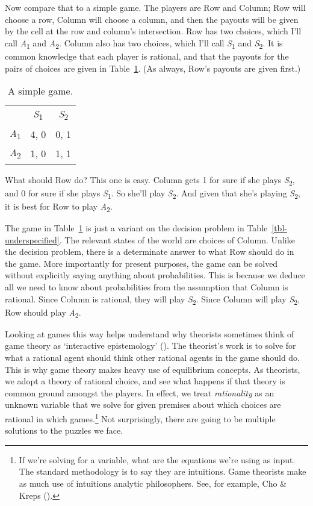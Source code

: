\documentclass[
  10pt,
  letterpaper,
  twoside]{scrbook}
\begin{document}
Now compare that to a simple game. The players are Row and Column; Row
will choose a row, Column will choose a column, and then the payouts
will be given by the cell at the row and column's intersection. Row has
two choices, which I'll call \emph{A}\textsubscript{1} and
\emph{A}\textsubscript{2}. Column also has two choices, which I'll call
\emph{S}\textsubscript{1} and \emph{S}\textsubscript{2}. It is common
knowledge that each player is rational, and that the payouts for the
pairs of choices are given in Table~\ref{tbl-simple-game}. (As always,
Row's payouts are given first.)

\begin{longtable}[]{@{}lcc@{}}
\caption{A simple game.}\label{tbl-simple-game}\tabularnewline
\toprule\noalign{}
\endfirsthead
\endhead
\bottomrule\noalign{}
\endlastfoot
& \emph{S}\textsubscript{1} & \emph{S}\textsubscript{2} \\
\emph{A}\textsubscript{1} & 4, 0 & 0, 1 \\
\emph{A}\textsubscript{2} & 1, 0 & 1, 1 \\
\end{longtable}

What should Row do? This one is easy. Column gets 1 for sure if she
plays \emph{S}\textsubscript{2}, and 0 for sure if she plays
\emph{S}\textsubscript{1}. So she'll play \emph{S}\textsubscript{2}. And
given that she's playing \emph{S}\textsubscript{2}, it is best for Row
to play \emph{A}\textsubscript{2}.

The game in Table~\ref{tbl-simple-game} is just a variant on the
decision problem in Table~\ref{tbl-underspecified}. The relevant states
of the world are choices of Column. Unlike the decision problem, there
is a determinate answer to what Row should do in the game. More
importantly for present purposes, the game can be solved without
explicitly saying anything about probabilities. This is because we
deduce all we need to know about probabilities from the assumption that
Column is rational. Since Column is rational, they will play
\emph{S}\textsubscript{2}. Since Column will play
\emph{S}\textsubscript{2}, Row should play \emph{A}\textsubscript{2}.

Looking at games this way helps understand why theorists sometimes think
of game theory as `interactive epistemology'
(). The theorist's work is to
solve for what a rational agent should think other rational agents in
the game should do. This is why game theory makes heavy use of
equilibrium concepts. As theorists, we adopt a theory of rational
choice, and see what happens if that theory is common ground amongst the
players. In effect, we treat \emph{rationality} as an unknown variable
that we solve for given premises about which choices are rational in
which games.\footnote{If we're solving for a variable, what are the
  equations we're using as input. The standard methodology is to say
  they are intuitions. Game theorists make as much use of intuitions
  analytic philosophers. See, for example, Cho \& Kreps
  ().} Not surprisingly, there are
going to be multiple solutions to the puzzles we face.
\end{document}
